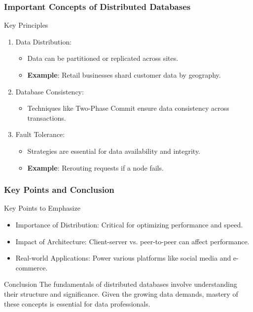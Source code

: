 \documentclass[aspectratio=169]{beamer}
\begin{document}
\begin{frame}[fragile]
    \frametitle{Important Concepts of Distributed Databases}
    \begin{block}{Key Principles}
        \begin{enumerate}
            \item Data Distribution:
                \begin{itemize}
                    \item Data can be partitioned or replicated across sites.
                    \item \textbf{Example}: Retail businesses shard customer data by geography.
                \end{itemize}
            \item Database Consistency:
                \begin{itemize}
                    \item Techniques like Two-Phase Commit ensure data consistency across transactions.
                \end{itemize}
            \item Fault Tolerance:
                \begin{itemize}
                    \item Strategies are essential for data availability and integrity.
                    \item \textbf{Example}: Rerouting requests if a node fails.
                \end{itemize}
        \end{enumerate}
    \end{block}
\end{frame}

\begin{frame}[fragile]
    \frametitle{Key Points and Conclusion}
    \begin{block}{Key Points to Emphasize}
        \begin{itemize}
            \item Importance of Distribution: Critical for optimizing performance and speed.
            \item Impact of Architecture: Client-server vs. peer-to-peer can affect performance.
            \item Real-world Applications: Power various platforms like social media and e-commerce.
        \end{itemize}
    \end{block}

    \begin{block}{Conclusion}
        The fundamentals of distributed databases involve understanding their structure and significance. Given the growing data demands, mastery of these concepts is essential for data professionals.
    \end{block}
\end{frame}
\end{document}
